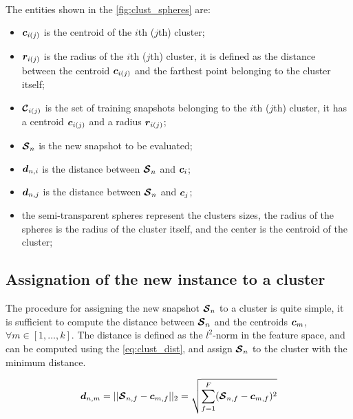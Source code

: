 \paragraph*{}
The entities shown in the \autoref{fig:clust_spheres} are:
\begin{itemize}
  \item $\bm{c}_{i(j)}$ is the centroid of the $i$th ($j$th) cluster;
  \item $\bm{r}_{i(j)}$ is the radius of the $i$th ($j$th) cluster, it is defined as the distance between the centroid $\bm{c}_{i(j)}$ and the farthest point belonging to the cluster itself;
  \item $\bm{\mathcal{C}}_{i(j)}$ is the set of training snapshots belonging to the $i$th ($j$th) cluster, it has a centroid $\bm{c}_{i(j)}$ and a radius $\bm{r}_{i(j)}$;
  \item $\bm{\mathcal{S}}_n$ is the new snapshot to be evaluated;
  \item $\bm{d}_{n,i}$ is the distance between $\bm{\mathcal{S}}_n$ and $\bm{c}_i$;
  \item $\bm{d}_{n,j}$ is the distance between $\bm{\mathcal{S}}_n$ and $\bm{c}_j$;
  \item the semi-transparent spheres represent the clusters sizes, the radius of the spheres is the radius of the cluster itself, and the center is the centroid of the cluster;
\end{itemize}

\subsection{Assignation of the new instance to a cluster} 
The procedure for assigning the new snapshot $\bm{\mathcal{S}}_n$ to a cluster is quite simple, it is sufficient to compute the distance between $\bm{\mathcal{S}}_n$ and the centroids $\bm{c}_m$, $\forall m \in  [1, \dots , k]$. The distance is defined as the $l^2$-norm in the feature space, and can be computed using the \autoref{eq:clust_dist}, and assign $\bm{\mathcal{S}}_n$ to the cluster with the minimum distance.

\begin{equation}
  \label{eq:clust_dist}
  \bm{d}_{n,m} = ||\bm{\mathcal{S}}_{n,f} - \bm{c}_{m,f}||_2 = \sqrt{\sum_{f=1}^{F} (\bm{\mathcal{S}}_{n,f} - \bm{c}_{m,f})^2}
\end{equation}

